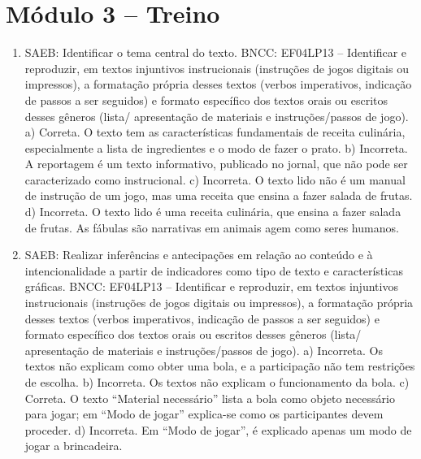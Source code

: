 \section*{Módulo 3 – Treino}

\begin{enumerate}
\item
SAEB: Identificar o tema central do texto.
BNCC: EF04LP13 -- Identificar e reproduzir, em textos injuntivos
instrucionais (instruções de jogos digitais ou impressos), a formatação
própria desses textos (verbos imperativos, indicação de passos a ser
seguidos) e formato específico dos textos orais ou escritos desses
gêneros (lista/ apresentação de materiais e instruções/passos de jogo).
a) Correta. O texto tem as características fundamentais de receita
culinária, especialmente a lista de ingredientes e o modo de fazer o prato.
b) Incorreta. A reportagem é um texto informativo, publicado no jornal, 
que não pode ser caracterizado como instrucional.
c) Incorreta. O texto lido não é um manual de instrução de um jogo, mas
uma receita que ensina a fazer salada de frutas.  
d) Incorreta. O texto lido é uma receita culinária, que ensina a fazer 
salada de frutas. As fábulas são narrativas em animais agem como seres
humanos.

\item
SAEB: Realizar inferências e antecipações em relação ao conteúdo e
à intencionalidade a partir de indicadores como tipo de texto e
características gráficas.
BNCC: EF04LP13 -- Identificar e reproduzir, em textos injuntivos
instrucionais (instruções de jogos digitais ou impressos), a formatação
própria desses textos (verbos imperativos, indicação de passos a ser
seguidos) e formato específico dos textos orais ou escritos desses
gêneros (lista/ apresentação de materiais e instruções/passos de jogo).
a) Incorreta. Os textos não explicam como obter uma bola, e a 
participação não tem restrições de escolha.  
b) Incorreta. Os textos não explicam o funcionamento da bola.
c) Correta. O texto ``Material necessário'' lista a bola como objeto 
necessário para jogar; em ``Modo de jogar'' explica-se como os 
participantes devem proceder.
d) Incorreta. Em ``Modo de jogar'', é explicado apenas um modo de jogar
a brincadeira.


\end{enumerate}
